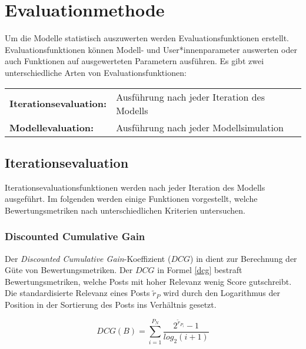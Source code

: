 \chapter{Evaluationmethode}
\label{chap:evaluationsmethode}

Um die Modelle statistisch auszuwerten werden Evaluationsfunktionen erstellt. Evaluationsfunktionen können Modell-  und User*innenparameter auswerten oder auch Funktionen auf ausgewerteten Parametern ausführen.
Es gibt zwei unterschiedliche Arten von Evaluationsfunktionen:

\begin{table}[!htbp]
	\begin{tabularx}{\textwidth}{lX}
		\textbf{Iterationsevaluation:} &  Ausführung nach jeder Iteration des Modells\\
		\textbf{Modellevaluation:} & Ausführung nach jeder Modellsimulation  \\
	\end{tabularx}
\end{table}

\section{Iterationsevaluation}
\label{sec:evaluationsfunktionen}

Iterationsevaluationsfunktionen werden nach jeder Iteration des Modells ausgeführt. Im folgenden werden einige Funktionen vorgestellt, welche Bewertungsmetriken nach unterschiedlichen Kriterien untersuchen.

\subsection{Discounted Cumulative Gain}

Der \textit{Discounted Cumulative Gain}-Koeffizient ($DCG$) in \cite{Biega2018405} dient zur Berechnung der Güte von Bewertungsmetriken. Der $DCG$ in Formel \ref{dcg} bestraft Bewertungsmetriken, welche Posts mit hoher Relevanz wenig Score gutschreibt. Die standardisierte Relevanz eines Posts ${\tilde{r}}_{P}$ wird durch den Logarithmus der Position in der Sortierung des Posts ins Verhältnis gesetzt.

\begin{equation}
\label{dcg}
DCG(B) = \sum_{i = 1}^{P_N}\frac{2^{{\tilde{r}}_{P_i}}-1}{log_2(i + 1)}
\end{equation} 

